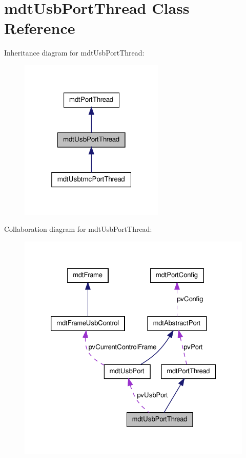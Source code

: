 \hypertarget{classmdt_usb_port_thread}{
\section{mdtUsbPortThread Class Reference}
\label{classmdt_usb_port_thread}
}


Inheritance diagram for mdtUsbPortThread:\nopagebreak
\begin{figure}[H]
\begin{center}
\leavevmode
\includegraphics[width=196pt]{classmdt_usb_port_thread__inherit__graph}
\end{center}
\end{figure}


Collaboration diagram for mdtUsbPortThread:
\nopagebreak
\begin{figure}[H]
\begin{center}
\leavevmode
\includegraphics[width=326pt]{classmdt_usb_port_thread__coll__graph}
\end{center}
\end{figure}
